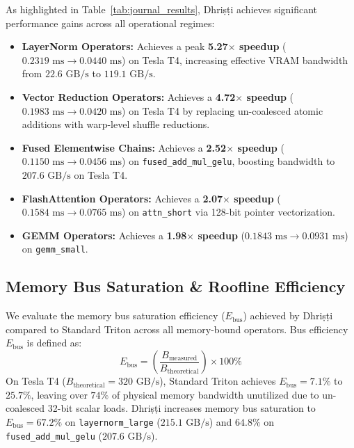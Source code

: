 \documentclass[10pt,journal,compsoc]{IEEEtran}
\begin{document}
As highlighted in Table~\ref{tab:journal_results}, Dhri\d{s}\d{t}i achieves significant performance gains across all operational regimes:
\begin{itemize}
    \item \textbf{LayerNorm Operators:} Achieves a peak \textbf{5.27$\times$ speedup} ($0.2319\text{ ms} \rightarrow 0.0440\text{ ms}$) on Tesla T4, increasing effective VRAM bandwidth from $22.6\text{ GB/s}$ to $119.1\text{ GB/s}$.
    \item \textbf{Vector Reduction Operators:} Achieves a \textbf{4.72$\times$ speedup} ($0.1983\text{ ms} \rightarrow 0.0420\text{ ms}$) on Tesla T4 by replacing un-coalesced atomic additions with warp-level shuffle reductions.
    \item \textbf{Fused Elementwise Chains:} Achieves a \textbf{2.52$\times$ speedup} ($0.1150\text{ ms} \rightarrow 0.0456\text{ ms}$) on \texttt{fused\_add\_mul\_gelu}, boosting bandwidth to $207.6\text{ GB/s}$ on Tesla T4.
    \item \textbf{FlashAttention Operators:} Achieves a \textbf{2.07$\times$ speedup} ($0.1584\text{ ms} \rightarrow 0.0765\text{ ms}$) on \texttt{attn\_short} via 128-bit pointer vectorization.
    \item \textbf{GEMM Operators:} Achieves a \textbf{1.98$\times$ speedup} ($0.1843\text{ ms} \rightarrow 0.0931\text{ ms}$) on \texttt{gemm\_small}.
\end{itemize}

\subsection{Memory Bus Saturation \& Roofline Efficiency}
We evaluate the memory bus saturation efficiency ($E_{\text{bus}}$) achieved by Dhri\d{s}\d{t}i compared to Standard Triton across all memory-bound operators. Bus efficiency $E_{\text{bus}}$ is defined as:
\begin{equation}
E_{\text{bus}} = \left( \frac{B_{\text{measured}}}{B_{\text{theoretical}}} \right) \times 100\%
\end{equation}
On Tesla T4 ($B_{\text{theoretical}} = 320\text{ GB/s}$), Standard Triton achieves $E_{\text{bus}} = 7.1\%$ to $25.7\%$, leaving over $74\%$ of physical memory bandwidth unutilized due to un-coalesced 32-bit scalar loads. Dhri\d{s}\d{t}i increases memory bus saturation to $E_{\text{bus}} = 67.2\%$ on \texttt{layernorm\_large} ($215.1\text{ GB/s}$) and $64.8\%$ on \texttt{fused\_add\_mul\_gelu} ($207.6\text{ GB/s}$).
\end{document}
